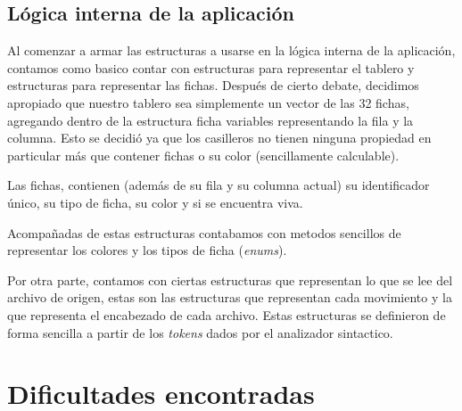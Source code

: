 \documentclass[a4paper,10pt]{article}
\begin{document}
\subsection{Lógica interna de la aplicación }

Al comenzar a armar las estructuras a usarse en la lógica interna de la aplicación, contamos como basico contar con estructuras
para representar el tablero y estructuras para representar las fichas. Después de cierto debate, decidimos apropiado que nuestro
tablero sea simplemente un vector de las 32 fichas, agregando dentro de la estructura ficha variables representando la fila y la 
columna. Esto se decidió ya que los casilleros no tienen ninguna propiedad en particular más que contener fichas o su color 
(sencillamente calculable).

Las fichas, contienen (además de su fila y su columna actual) su identificador único, su tipo de ficha, su color y si se encuentra 
viva.

Acompañadas de estas estructuras contabamos con metodos sencillos de representar los colores y los tipos de ficha (\textit{enums}).

Por otra parte, contamos con ciertas estructuras que representan lo que se lee del archivo de origen, estas son las estructuras que 
representan cada movimiento y la que representa el encabezado de cada archivo. Estas estructuras se definieron de forma sencilla a 
partir de los \textit{tokens} dados por el analizador sintactico.





\newpage

\section{Dificultades encontradas}
\end{document}
